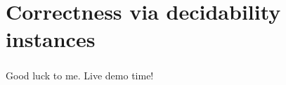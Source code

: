 
\section{Correctness via decidability instances}
\begin{frame}\frametitle{\insertsubsection}

Good luck to me. Live demo time!

\end{frame}

